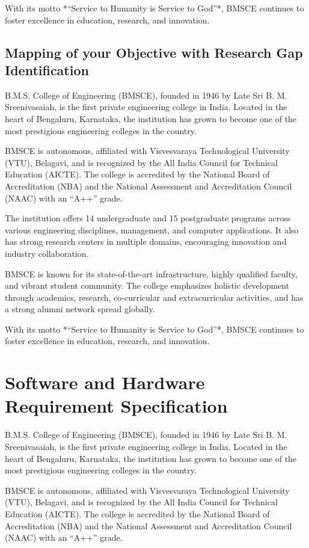 \documentclass[12pt,a4paper]{report}
\begin{document}
With its motto *“Service to Humanity is Service to God”*, BMSCE continues to foster 
excellence in education, research, and innovation.
\section{ Mapping of your Objective with Research Gap Identification }
B.M.S. College of Engineering (BMSCE), founded in 1946 by Late Sri B. M. Sreenivasaiah, 
is the first private engineering college in India. Located in the heart of Bengaluru, 
Karnataka, the institution has grown to become one of the most prestigious engineering 
colleges in the country. 

BMSCE is autonomous, affiliated with Visvesvaraya Technological University (VTU), Belagavi, 
and is recognized by the All India Council for Technical Education (AICTE). The college is 
accredited by the National Board of Accreditation (NBA) and the National Assessment and 
Accreditation Council (NAAC) with an “A++” grade.

The institution offers 14 undergraduate and 15 postgraduate programs across various 
engineering disciplines, management, and computer applications. It also has strong research 
centers in multiple domains, encouraging innovation and industry collaboration. 

BMSCE is known for its state-of-the-art infrastructure, highly qualified faculty, and vibrant 
student community. The college emphasizes holistic development through academics, research, 
co-curricular and extracurricular activities, and has a strong alumni network spread 
globally. 

With its motto *“Service to Humanity is Service to God”*, BMSCE continues to foster 
excellence in education, research, and innovation.

\chapter{Software and Hardware Requirement Specification }
B.M.S. College of Engineering (BMSCE), founded in 1946 by Late Sri B. M. Sreenivasaiah, 
is the first private engineering college in India. Located in the heart of Bengaluru, 
Karnataka, the institution has grown to become one of the most prestigious engineering 
colleges in the country. 

BMSCE is autonomous, affiliated with Visvesvaraya Technological University (VTU), Belagavi, 
and is recognized by the All India Council for Technical Education (AICTE). The college is 
accredited by the National Board of Accreditation (NBA) and the National Assessment and 
Accreditation Council (NAAC) with an “A++” grade.
\end{document}
